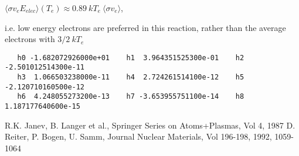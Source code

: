 \documentclass[12pt,dvipdfmx]{article}
\begin{document}
$\langle\sigma v_e E_{elec}\rangle(T_e) \approx 0.89 ~kT_e ~\langle\sigma v_e\rangle$,

i.e. low energy electrons are preferred in this reaction, rather than the average electrons with $3/2~kT_e$


\begin{small}\begin{verbatim}
   h0 -1.682072926000e+01    h1  3.964351525300e-01    h2 -2.501012514300e-11
   h3  1.066503238000e-11    h4  2.724261514100e-12    h5 -2.120710160500e-12
   h6  4.248055273200e-13    h7 -3.653955751100e-14    h8  1.187177640600e-15

\end{verbatim}\end{small}
\newpage
\begin{thebibliography}{99}
 R.K. Janev, B. Langer et al.,  Springer Series on Atoms+Plasmas,
                   Vol 4, 1987
 D. Reiter, P. Bogen, U. Samm, Journal Nuclear Materials, Vol 196-198, 1992, 1059-1064
\end{thebibliography}
\end{document}
